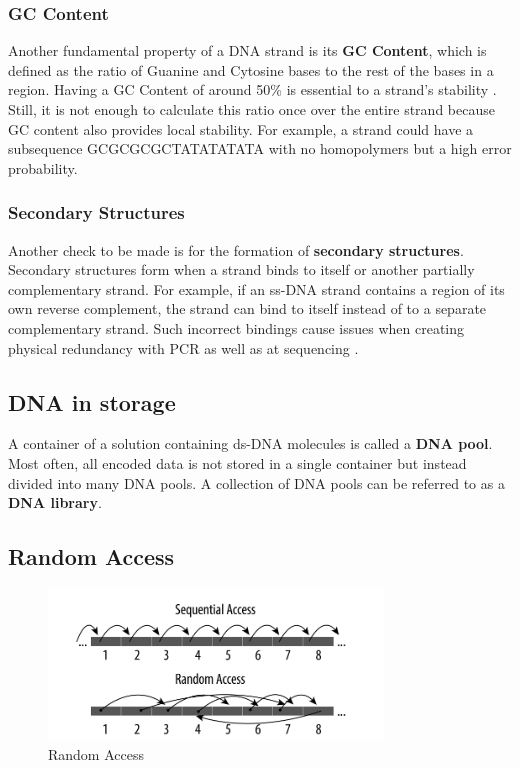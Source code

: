 \documentclass[a4paper,conference]{IEEEtran}
\begin{document}
\subsubsection{GC Content}
Another fundamental property of a DNA strand is its \textbf{GC Content}, which is defined as the ratio of Guanine and Cytosine bases to the rest of the bases in a region. Having a GC Content of around 50\% is essential to a strand's stability \cite{gccontent}. Still, it is not enough to calculate this ratio once over the entire strand because GC content also provides local stability. For example, a strand could have a subsequence GCGCGCGCTATATATATA with no homopolymers but a high error probability. \\


\subsubsection{Secondary Structures}
Another check to be made is for the formation of \textbf{secondary structures}. Secondary structures form when a strand binds to itself or another partially complementary strand. For example, if an ss-DNA strand contains a region of its own reverse complement, the strand can bind to itself instead of to a separate complementary strand. Such incorrect bindings cause issues when creating physical redundancy with PCR \cite{pcr} as well as at sequencing \cite{secondarystructures}. \\


\subsection{DNA in storage}
A container of a solution containing ds-DNA molecules is called a \textbf{DNA pool}. Most often, all encoded data is not stored in a single container but instead divided into many DNA pools. A collection of DNA pools can be referred to as a \textbf{DNA library}. 

\subsection{Random Access}
\begin{figure}
\centering
\includegraphics[width=3.5in]{randomaccess}
\caption{Random Access}
\label{randomaccess}
\end{figure}
\end{document}
